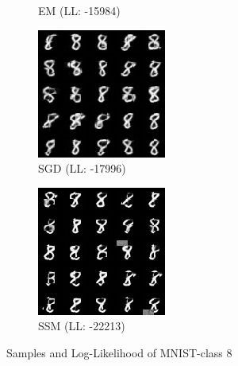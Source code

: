 \begin{figure}[H]
\begin{subfigure}[b]{0.24\textwidth}
        \caption{EM (LL: -15984)}
    \end{subfigure}
    \begin{subfigure}[b]{0.24\textwidth}
        \centering
        \includegraphics[width=\textwidth]{figures/einsum/8mnist_SGD.png} 
        \caption{SGD (LL: -17996)}
    \end{subfigure}
    \begin{subfigure}[b]{0.24\textwidth}
        \centering
        \includegraphics[width=\textwidth]{figures/einsum/8mnist_SSM.png}
        \caption{SSM (LL: -22213)}
    \end{subfigure}
    \caption{Samples and Log-Likelihood of MNIST-class 8}
\end{figure}

